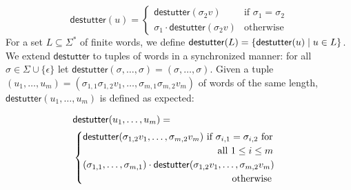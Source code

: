 \documentclass[iicol,lineno]{sn-jnl}
\newcommand{\destutter}{\mathsf{destutter}}
\newcommand{\?}{\text{?}}
\newcommand{\suchthat}{\;\ifnum\currentgrouptype=16 \middle\fi|\;}
\let\st\suchthat
\begin{document}
	\begin{equation*}
		\destutter(u) =
		\begin{cases}
			\destutter(\sigma_2 v) & \text{if } \sigma_1 = \sigma_2 \\
			\sigma_1 \cdot \destutter(\sigma_2 v) & \text{otherwise}
		\end{cases}
	\end{equation*}
	For a set $L \subseteq \Sigma^*$ of finite words, we define $\destutter(L) = 
	\{\destutter(u) \st u \in L\}$.
	We extend $\destutter$ to tuples of words in a synchronized manner: for all $\sigma \in \Sigma \cup \{\epsilon\}$  let $\destutter(\sigma, \ldots, \sigma) = (\sigma, \ldots, \sigma)$.
	Given a tuple $(u_1, \ldots, u_m) = (\sigma_{1,1} \sigma_{1,2} v_1, \ldots, \sigma_{m,1} \sigma_{m,2} v_m)$ of words of the same length, $\destutter(u_1, \ldots, u_m)$ is defined as expected:
	
	\begin{align*}
		&\destutter(u_1, \ldots, u_m) = \\
		&\begin{cases}
			\destutter(\sigma_{1,2} v_1, \ldots, \sigma_{m,2} v_m) \text{ if $\sigma_{i,1} = \sigma_{i,2}$ for}\\ 
			\hspace{14em}\text{all $1 \leq i \leq m$} \\
			(\sigma_{1,1}, \ldots, \sigma_{m,1}) \cdot \destutter(\sigma_{1,2} v_1, \ldots, \sigma_{m,2} v_m) \\
			\hspace{15.5em}\text{otherwise}
		\end{cases}
	\end{align*}
	
\end{document}
